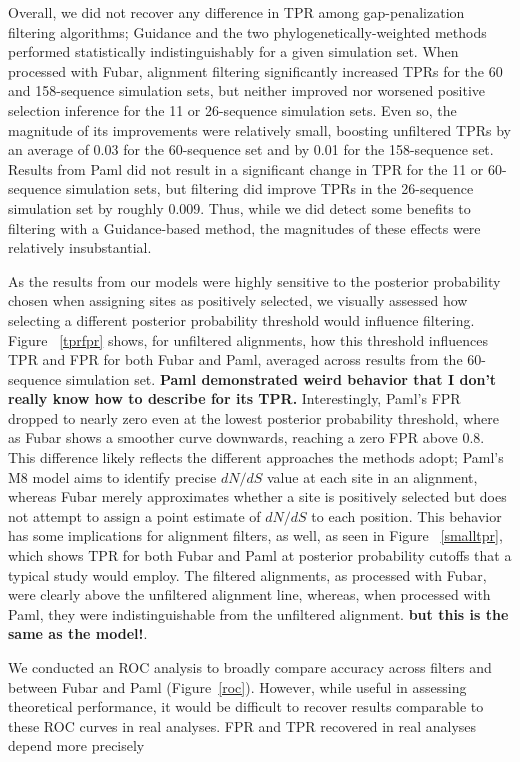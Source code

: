 \documentclass[10pt]{article}
\begin{document}
Overall, we did not recover any difference in TPR among gap-penalization filtering algorithms; Guidance and the two phylogenetically-weighted methods performed statistically indistinguishably for a given simulation set. When processed with Fubar, alignment filtering significantly increased TPRs for the 60 and 158-sequence simulation sets, but neither improved nor worsened positive selection inference for the 11 or 26-sequence simulation sets. Even so, the magnitude of its improvements were relatively small, boosting unfiltered TPRs by an average of 0.03 for the 60-sequence set and by 0.01 for the 158-sequence set. 
Results from Paml did not result in a significant change in TPR for the 11 or 60-sequence simulation sets, but filtering did improve TPRs in the 26-sequence simulation set by roughly 0.009. Thus, while we did detect some benefits to filtering with a Guidance-based method, the magnitudes of these effects were relatively insubstantial.

As the results from our models were highly sensitive to the posterior probability chosen when assigning sites as positively selected, we visually assessed how selecting a different posterior probability threshold would influence filtering. Figure ~\ref{tprfpr} shows, for unfiltered alignments, how this threshold influences TPR and FPR for both Fubar and Paml, averaged across results from the 60-sequence simulation set.
\textbf{Paml demonstrated weird behavior that I don't really know how to describe for its TPR.} Interestingly, Paml's FPR dropped to nearly zero even at the lowest posterior probability threshold, where as Fubar shows a smoother curve downwards, reaching a zero FPR above 0.8. This difference likely reflects the different approaches the methods adopt; Paml's M8 model aims to identify precise $dN/dS$ value at each site in an alignment, whereas Fubar merely approximates whether a site is positively selected but does not attempt to assign a point estimate of $dN/dS$ to each position. This behavior has some implications for alignment filters, as well, as seen in Figure ~\ref{smalltpr}, which shows TPR for both Fubar and Paml at posterior probability cutoffs that a typical study would employ. The filtered alignments, as processed with Fubar, were clearly above the unfiltered alignment line, whereas, when processed with Paml, they were indistinguishable from the unfiltered alignment. \textbf{but this is the same as the model!}.

We conducted an ROC analysis to broadly compare accuracy across filters and between Fubar and Paml (Figure~\ref{roc}). However, while useful in assessing theoretical performance, it would be difficult to recover results comparable to these ROC curves in real analyses. FPR and TPR recovered in real analyses depend more precisely
\end{document}
